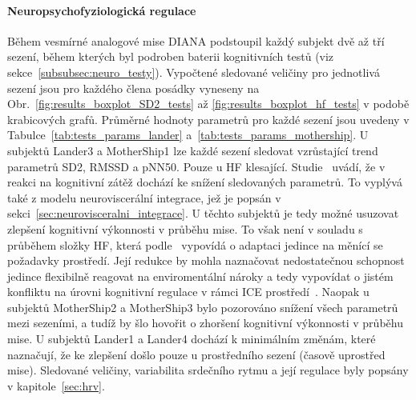 \paragraph{Neuropsychofyziologická regulace}
Během vesmírné analogové mise DIANA podstoupil každý subjekt dvě až tří sezení,
během kterých byl podroben baterii kognitivních testů (viz
sekce~\ref{subsubsec:neuro_testy}). Vypočtené sledované veličiny pro jednotlivá
sezení jsou pro každého člena posádky vyneseny na
Obr.~\ref{fig:results_boxplot_SD2_tests} až \ref{fig:results_boxplot_hf_tests} v
podobě krabicových grafů. Průměrné hodnoty parametrů pro každé sezení jsou
uvedeny v Tabulce~\ref{tab:tests_params_lander}
a~\ref{tab:tests_params_mothership}. U subjektů Lander3 a MotherShip1 lze každé
sezení sledovat vzrůstající trend parametrů SD2, RMSSD a pNN50. Pouze u HF
klesající. Studie~\cite{Castaldo2019,Pham2021,Ishaque2021} uvádí, že v reakci na
kognitivní zátěž dochází ke snížení sledovaných parametrů. To vyplývá také z
modelu neuroviscerální integrace, jež je popsán v
sekci~\ref{sec:neurovisceralni_integrace}. U těchto subjektů je tedy možné
usuzovat zlepšení kognitivní výkonnosti v průběhu mise. To však není v souladu s
průběhem složky HF, která podle~\cite{Forte2019} vypovídá o adaptaci jedince na
měnící se požadavky prostředí. Její redukce by mohla naznačovat nedostatečnou
schopnost jedince flexibilně reagovat na enviromentální nároky a tedy vypovídat
o jistém konfliktu na úrovni kognitivní regulace v rámci \gls{ICE}
prostředí~\cite{Forte2019,Ayres2021}. Naopak u subjektů MotherShip2 a
MotherShip3 bylo pozorováno snížení všech parametrů mezi sezeními, a tudíž by
šlo hovořit o zhoršení kognitivní výkonnosti v průběhu mise. U subjektů Lander1
a Lander4 dochází k minimálním změnám, které naznačují, že ke zlepšení došlo
pouze u prostředního sezení (časově uprostřed mise). Sledované veličiny,
variabilita srdečního rytmu a její regulace byly popsány v
kapitole~\ref{sec:hrv}.	

